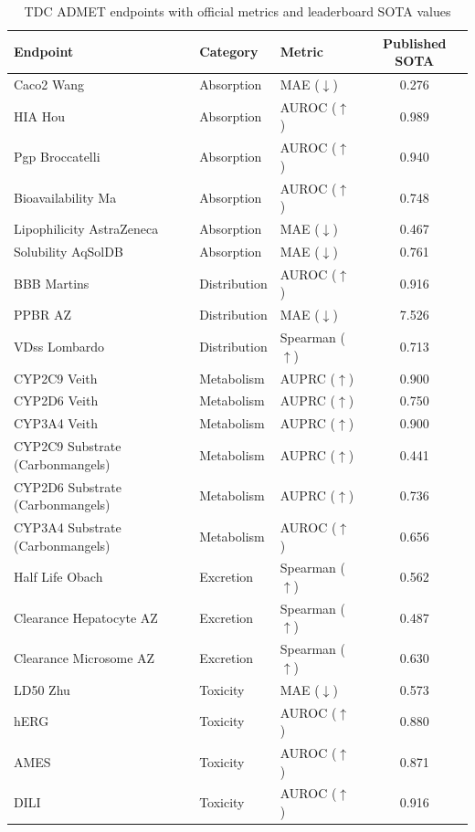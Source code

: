 \documentclass[11pt]{article}
\begin{document}
\begin{table}[h]
\centering
\caption{TDC ADMET endpoints with official metrics and leaderboard SOTA values}
\label{tab:metrics}
\small
\begin{tabular}{lllc}
\toprule
Endpoint & Category & Metric & Published SOTA \\
\midrule
Caco2 Wang & Absorption & MAE ($\downarrow$) & 0.276 \\
HIA Hou & Absorption & AUROC ($\uparrow$) & 0.989 \\
Pgp Broccatelli & Absorption & AUROC ($\uparrow$) & 0.940 \\
Bioavailability Ma & Absorption & AUROC ($\uparrow$) & 0.748 \\
Lipophilicity AstraZeneca & Absorption & MAE ($\downarrow$) & 0.467 \\
Solubility AqSolDB & Absorption & MAE ($\downarrow$) & 0.761 \\
BBB Martins & Distribution & AUROC ($\uparrow$) & 0.916 \\
PPBR AZ & Distribution & MAE ($\downarrow$) & 7.526 \\
VDss Lombardo & Distribution & Spearman ($\uparrow$) & 0.713 \\
CYP2C9 Veith & Metabolism & AUPRC ($\uparrow$) & 0.900 \\
CYP2D6 Veith & Metabolism & AUPRC ($\uparrow$) & 0.750 \\
CYP3A4 Veith & Metabolism & AUPRC ($\uparrow$) & 0.900 \\
CYP2C9 Substrate (Carbonmangels) & Metabolism & AUPRC ($\uparrow$) & 0.441 \\
CYP2D6 Substrate (Carbonmangels) & Metabolism & AUPRC ($\uparrow$) & 0.736 \\
CYP3A4 Substrate (Carbonmangels) & Metabolism & AUROC ($\uparrow$) & 0.656 \\
Half Life Obach & Excretion & Spearman ($\uparrow$) & 0.562 \\
Clearance Hepatocyte AZ & Excretion & Spearman ($\uparrow$) & 0.487 \\
Clearance Microsome AZ & Excretion & Spearman ($\uparrow$) & 0.630 \\
LD50 Zhu & Toxicity & MAE ($\downarrow$) & 0.573 \\
hERG & Toxicity & AUROC ($\uparrow$) & 0.880 \\
AMES & Toxicity & AUROC ($\uparrow$) & 0.871 \\
DILI & Toxicity & AUROC ($\uparrow$) & 0.916 \\
\bottomrule
\end{tabular}
\end{table}
\end{document}
